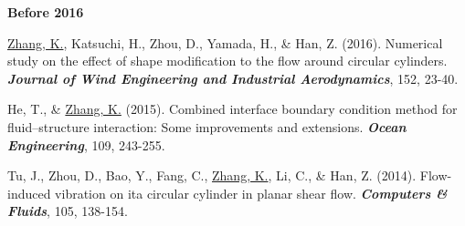 \documentclass[10pt]{article}
\begin{document}
{\begin{etaremune}
   \item [] {\color{Blue} {\bf  Before  2016} }
  
  \item \underline{Zhang, K.}, Katsuchi, H., Zhou, D., Yamada, H., \& Han, Z. (2016). Numerical study on the effect of shape modification to the flow around circular cylinders. \textit{\textbf{Journal of Wind Engineering and Industrial Aerodynamics}}, 152, 23-40.
  
  \item He, T., \& \underline{Zhang, K.} (2015). Combined interface boundary condition method for fluid–structure interaction: Some improvements and extensions. \textit{\textbf{Ocean Engineering}}, 109, 243-255.
  
  \item Tu, J., Zhou, D., Bao, Y., Fang, C., \underline{Zhang, K.}, Li, C., \& Han, Z. (2014). Flow-induced vibration on ita circular cylinder in planar shear flow. \textit{\textbf{Computers \& Fluids}}, 105, 138-154.
  
\end{etaremune}
}


\vspace{+0.1in}
\end{document}
